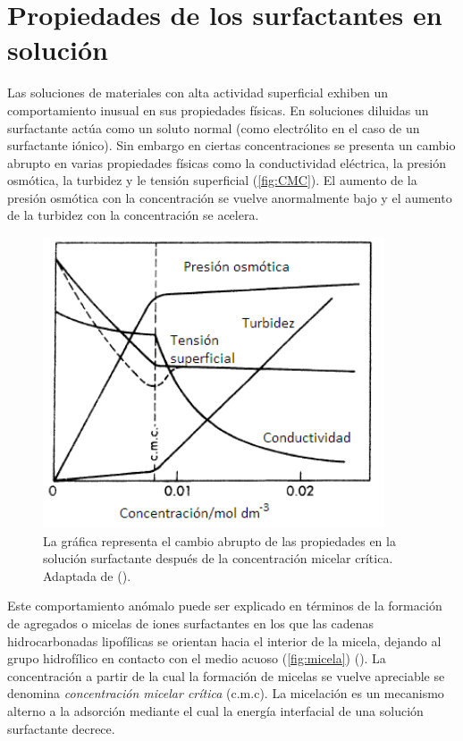 \section{Propiedades de los surfactantes en solución}
Las soluciones de materiales con alta actividad superficial exhiben un comportamiento inusual en sus propiedades físicas. En soluciones diluidas un surfactante actúa como un soluto normal (como electrólito en el caso de un surfactante iónico). Sin embargo en ciertas concentraciones 
se presenta un cambio abrupto en varias propiedades físicas como la conductividad eléctrica, la presión osmótica, la turbidez y le tensión superficial (\autoref{fig:CMC}). El aumento de la presión osmótica con la concentración se vuelve anormalmente bajo y el aumento de la turbidez con la concentración se acelera.

\begin{figure}
    \centering
    \includegraphics[width=0.9\textwidth]{Graphics/cmc.png}
    \caption[Concentracion micelar crítica]{La gráfica representa el cambio abrupto de las propiedades en la solución surfactante después de la concentración micelar crítica. Adaptada de (\cite{Duncan}). }
    \label{fig:CMC}
\end{figure}



Este comportamiento anómalo puede ser explicado en términos de la formación de agregados o micelas de iones surfactantes en los que las cadenas hidrocarbonadas lipofílicas se orientan hacia el interior de la micela, dejando al grupo hidrofílico en contacto con el medio acuoso (\autoref{fig:micela}) (\cite{McBain}). La concentración a partir de la cual la formación de micelas se vuelve apreciable se denomina \emph{concentración micelar crítica} (c.m.c). La micelación es un mecanismo alterno a la adsorción mediante el cual la energía interfacial de una solución surfactante decrece.

